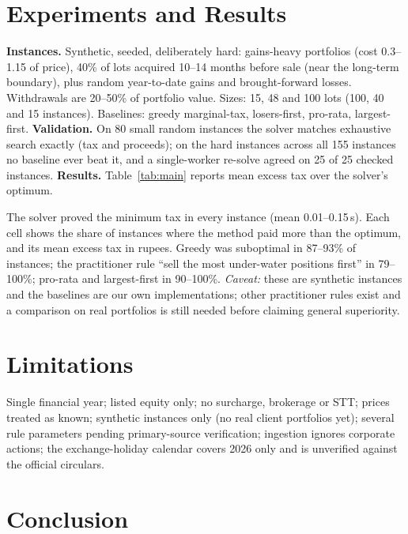 \documentclass[11pt]{article}
\begin{document}
\section{Experiments and Results}
\textbf{Instances.} Synthetic, seeded, deliberately hard: gains-heavy portfolios (cost 0.3--1.15 of price), 40\% of lots acquired
10--14 months before sale (near the long-term boundary), plus random year-to-date gains and brought-forward losses.
Withdrawals are 20--50\% of portfolio value. Sizes: 15, 48 and 100 lots (100, 40 and 15 instances). Baselines: greedy marginal-tax, losers-first, pro-rata, largest-first.
\textbf{Validation.} On 80 small random instances the solver matches exhaustive search exactly (tax and proceeds); on the
hard instances across all 155 instances no baseline ever beat it, and a single-worker re-solve agreed on 25 of 25 checked instances.
\textbf{Results.} Table~\ref{tab:main} reports mean excess tax over the solver's optimum.
\begin{table}[h]\centering\caption{Baselines versus the exact solver on hard synthetic instances.}\label{tab:main}\end{table}
The solver proved the minimum tax in every instance (mean 0.01--0.15\,s). Each cell shows the share of instances where the
method paid more than the optimum, and its mean excess tax in rupees. Greedy was suboptimal in 87--93\% of instances;
the practitioner rule ``sell the most under-water positions first'' in 79--100\%; pro-rata and largest-first in 90--100\%.
\emph{Caveat:} these are synthetic instances and the baselines are our own implementations; other practitioner rules exist
and a comparison on real portfolios is still needed before claiming general superiority.

\section{Limitations}
Single financial year; listed equity only; no surcharge, brokerage or STT; prices treated as known; synthetic instances only
(no real client portfolios yet); several rule parameters pending primary-source verification; ingestion ignores corporate actions; the exchange-holiday calendar covers 2026 only and is unverified against the official circulars.

\section{Conclusion}
\end{document}
